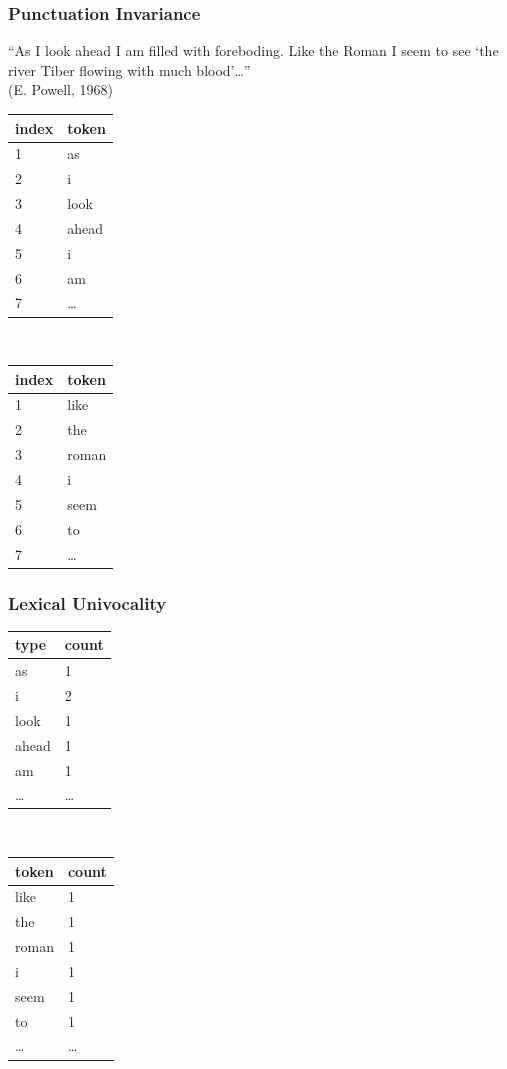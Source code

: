 \documentclass[11pt,compress,professionalfonts]{beamer}
\begin{document}
\begin{frame}[t]\frametitle{Punctuation Invariance}

``As I look ahead I am filled with foreboding.  Like the Roman I seem to see `the river Tiber flowing with much blood'\ldots ''\\
(E. Powell, 1968)
\begin{center}
\small
\begin{tabular}{ll}\toprule
index & token\\ \midrule
1 & as\\
2 & i\\
3 & look\\
4 & ahead\\
5 & i\\
6 & am\\
7 & \ldots\\ \bottomrule
\end{tabular}
~~~~~~~~~~
\begin{tabular}{ll}\toprule
index & token\\ \midrule
1 & like\\
2 & the\\
3 & roman\\
4 & i\\
5 & seem\\
6 & to\\
7 & \ldots\\ \bottomrule
\end{tabular}
\normalsize
\end{center}


\end{frame}
\begin{frame}[t]\frametitle{Lexical Univocality}

\begin{center}
\small
\begin{tabular}{ll}\toprule
type & count\\ \midrule
as & 1\\
i & 2\\
look & 1\\
ahead & 1\\
am & 1\\
\ldots & \ldots\\ \bottomrule
\end{tabular}
~~~~~~~~~~
\begin{tabular}{ll}\toprule
token & count\\ \midrule
like & 1\\
the & 1\\
roman & 1\\
i & 1\\
seem & 1\\
to & 1\\
\ldots & \ldots\\ \bottomrule
\end{tabular}
\normalsize
\end{center}

\end{frame}
\end{document}
